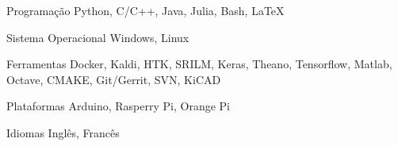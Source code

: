 

\begin{cvskills}

  \cvskill
    {Programação} %
    {Python, C/C++, Java, Julia, Bash, LaTeX} %

  \cvskill
    {Sistema Operacional} %
    {Windows, Linux} %

  \cvskill
    {Ferramentas} %
    {Docker, Kaldi, HTK, SRILM, Keras, Theano, Tensorflow, Matlab, Octave, CMAKE, Git/Gerrit, SVN, KiCAD} %

  \cvskill
    {Plataformas} %
    {Arduino, Rasperry Pi, Orange Pi} %

  \cvskill
    {Idiomas} %
    {Inglês, Francês} %

\end{cvskills}
